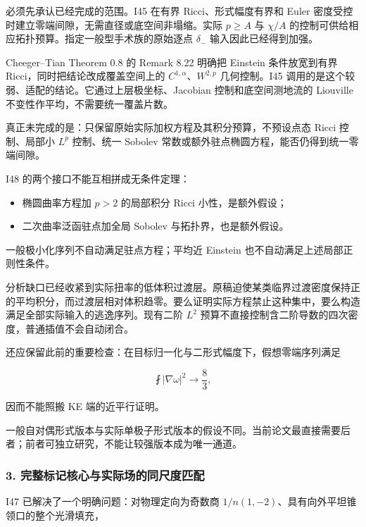 \documentclass[
  10pt,
]{article}
\providecommand{\tightlist}{%
  \setlength{\itemsep}{0pt}\setlength{\parskip}{0pt}}
\begin{document}
必须先承认已经完成的范围。I45 在有界 Ricci、形式幅度有界和 Euler
密度受控时建立零端间隙，无需直径或底空间非塌缩。实际 \(p\ge A\) 与
\(\chi/A\) 的控制可供给相应拓扑预算。指定一般型手术族的原始逐点
\(\delta_-\) 输入因此已经得到加强。

Cheeger--Tian Theorem 0.8 的 Remark 8.22 明确把 Einstein 条件放宽到有界
Ricci，同时把结论改成覆盖空间上的 \(C^{1,\alpha}\)、\(W^{2,p}\)
几何控制。I45 调用的是这个较弱、适配的结论。它通过上层极坐标、Jacobian
控制和底空间测地流的 Liouville 不变性作平均，不需要统一覆盖片数。

真正未完成的是：只保留原始实际加权方程及其积分预算，不预设点态 Ricci
控制、局部小 \(L^p\) 控制、统一 Sobolev
常数或额外驻点椭圆方程，能否仍得到统一零端间隙。

I48 的两个接口不能互相拼成无条件定理：

\begin{itemize}
\tightlist
\item
  椭圆曲率方程加 \(p>2\) 的局部积分 Ricci 小性，是额外假设；
\item
  二次曲率泛函驻点加全局 Sobolev 与拓扑界，也是额外假设。
\end{itemize}

一般极小化序列不自动满足驻点方程；平均近 Einstein
也不自动满足上述局部正则性条件。

分析缺口已经收紧到实际扭率的低体积过渡层。原稿迫使某类临界过渡密度保持正的平均积分，而过渡层相对体积趋零。要么证明实际方程禁止这种集中，要么构造满足全部实际输入的逃逸序列。现有二阶
\(L^2\) 预算不直接控制含二阶导数的四次密度，普通插值不会自动闭合。

还应保留此前的重要检查：在目标归一化与二形式幅度下，假想零端序列满足

\[
\fint|\nabla\omega|^2\longrightarrow\frac83,
\]

因而不能照搬 KE 端的近平行证明。

一般自对偶形式版本与实际单极子形式版本的假设不同。当前论文最直接需要后者；前者可独立研究，不能让较强版本成为唯一通道。

\hypertarget{ux5b8cux6574ux6807ux8bb0ux6838ux5fc3ux4e0eux5b9eux9645ux573aux7684ux540cux5c3aux5ea6ux5339ux914d}{%
\subsubsection{3.
完整标记核心与实际场的同尺度匹配}\label{ux5b8cux6574ux6807ux8bb0ux6838ux5fc3ux4e0eux5b9eux9645ux573aux7684ux540cux5c3aux5ea6ux5339ux914d}}

I47 已解决了一个明确问题：对物理定向为奇数商
\(1/n(1,-2)\)、具有向外平坦锥领口的整个光滑填充，
\end{document}
